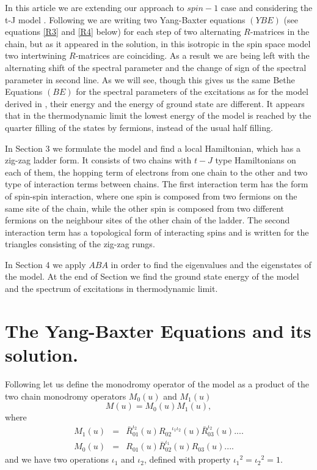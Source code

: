 \documentclass[a4paper,12pt]{article}
\begin{document}
In this article we are extending our approach to $spin-1$ case
and considering the t-J model \cite{AK,U,L,S,KOR,BBO,EK}. 
Following \cite{APSS}
we are writing two Yang-Baxter equations $(YBE)$ (see equations \ref{R3}
and \ref{R4} below) for each step of two alternating $R$-matrices
in the chain, but as it appeared in the solution, in this isotropic
in the spin space model two intertwining $R$-matrices are coinciding.
As a result we are being left with the alternating shift of the 
spectral parameter and the change of sign of the spectral parameter in
 second line. As we will see, though this gives us the same Bethe 
Equations $(BE)$ for the spectral parameters of the excitations
as for the model derived in \cite{ZV,ZV1,FR}, 
their energy and the energy of ground state are different. It appears
that in the thermodynamic limit the lowest energy of the model is
reached by the quarter filling of the states by  
fermions, instead of the usual half filling. 

In Section 3 we formulate the model and find a local Hamiltonian,
which has a zig-zag ladder form. It consists of two chains with $t-J$
type Hamiltonians on each of them, the hopping term of electrons
from one chain to the other and two type of interaction terms between 
chains. The first interaction term has the form of spin-spin 
interaction, where one spin is composed from two fermions 
on the same site of the chain, while the other spin is composed
from two different fermions on the neighbour sites of the other chain
of the ladder. The second interaction term has a topological form
of interacting spins and is written for the triangles consisting
of the zig-zag rungs.

In Section 4 we apply $ABA$ in order to find the eigenvalues and 
the eigenstates of the model. At the end of Section we find the ground
state energy of the model and the spectrum of excitations in 
thermodynamic limit.


\section{The Yang-Baxter Equations and its solution.}
\indent

Following \cite{APSS} let us define the monodromy operator of the model as a
product of the two chain monodromy operators $M_0(u)$ and $M_1(u)$
\begin{equation}
\label{M1}
M(u)=M_0(u)M_1(u),
\end{equation}
where 
\begin{eqnarray}
\label{M2}
M_1(u)&=&\bar{R}_{01}^{\iota_2}(u) {R_{02}}^{\iota_1\iota_2}(u) \bar{R}_{03}^{\iota_2}(u)
....\nonumber\\ 
M_0(u)&=&R_{01}(u) \bar{R}_{02}^{\iota_1}(u)R_{03}(u)....
\end{eqnarray}
and we have two operations $\iota_1$ and $\iota_2$,  defined with property 
${\iota_1}^2={\iota_2}^2=1$.
\end{document}
